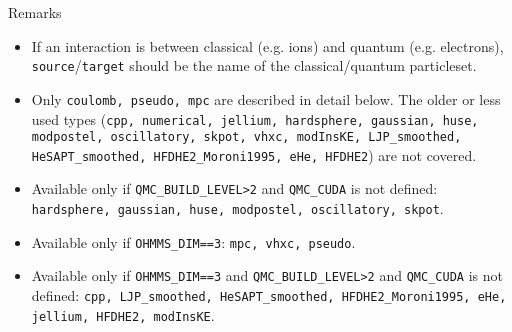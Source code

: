 Remarks
\begin{itemize}
  \item{If an interaction is between classical (e.g. ions) and quantum (e.g. electrons), \texttt{source}/\texttt{target} should be the name of the classical/quantum particleset.}
  \item{Only \texttt{coulomb, pseudo, mpc} are described in detail below.  The older or less used types (\texttt{cpp, numerical, jellium, hardsphere, gaussian, huse, modpostel, oscillatory, skpot, vhxc, modInsKE, LJP\_smoothed, HeSAPT\_smoothed, HFDHE2\_Moroni1995, eHe, HFDHE2}) are not covered.}
  \item{Available only if \texttt{QMC\_BUILD\_LEVEL>2} and \texttt{QMC\_CUDA} is not defined: \texttt{hardsphere, gaussian, huse, modpostel, oscillatory, skpot}.}
  \item{Available only if \texttt{OHMMS\_DIM==3}: \texttt{mpc, vhxc, pseudo}.}
  \item{Available only if \texttt{OHMMS\_DIM==3} and \texttt{QMC\_BUILD\_LEVEL>2} and \texttt{QMC\_CUDA} is not defined: \texttt{cpp, LJP\_smoothed, HeSAPT\_smoothed, HFDHE2\_Moroni1995, eHe, jellium, HFDHE2, modInsKE}.}
\end{itemize}







